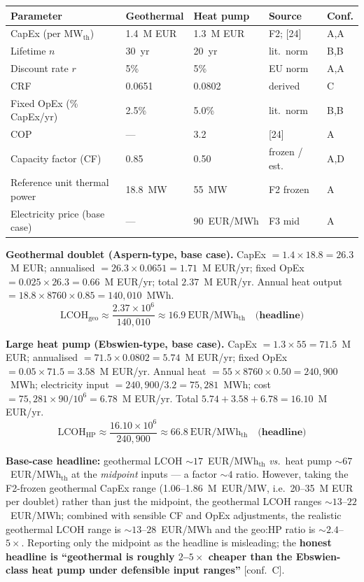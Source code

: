 \documentclass{article}
\begin{document}
\begin{center}
\begin{tabular}{lllll}
\hline
\textbf{Parameter} & \textbf{Geothermal} & \textbf{Heat pump} & \textbf{Source} & \textbf{Conf.} \\
\hline
CapEx (per MW$_{\mathrm{th}}$) & 1.4~M EUR & 1.3~M EUR & F2; [24] & A,A \\
Lifetime $n$                  & 30~yr     & 20~yr     & lit.\ norm & B,B \\
Discount rate $r$             & 5\%       & 5\%       & EU norm    & A,A \\
CRF                           & 0.0651    & 0.0802    & derived    & C \\
Fixed OpEx (\% CapEx/yr)      & 2.5\%     & 5.0\%     & lit.\ norm & B,B \\
COP                           & ---       & 3.2       & [24]       & A \\
Capacity factor (CF)          & 0.85      & 0.50      & frozen / est.& A,D \\
Reference unit thermal power  & 18.8~MW   & 55~MW     & F2 frozen  & A \\
Electricity price (base case) & ---       & 90~EUR/MWh & F3 mid     & A \\
\hline
\end{tabular}
\end{center}

\textbf{Geothermal doublet (Aspern-type, base case).} CapEx
$= 1.4 \times 18.8 = 26.3$~M EUR; annualised
$= 26.3 \times 0.0651 = 1.71$~M EUR/yr; fixed OpEx
$= 0.025 \times 26.3 = 0.66$~M EUR/yr; total
$2.37$~M EUR/yr. Annual heat output
$= 18.8 \times 8760 \times 0.85 = 140{,}010$~MWh.
\[
\mathrm{LCOH_{geo}} \approx \frac{2.37 \times 10^6}{140{,}010}
       \approx 16.9 \mathrm{~EUR/MWh_{th}}\quad\textbf{(headline)}
\]

\textbf{Large heat pump (Ebswien-type, base case).} CapEx
$= 1.3 \times 55 = 71.5$~M EUR; annualised
$= 71.5 \times 0.0802 = 5.74$~M EUR/yr; fixed OpEx
$= 0.05 \times 71.5 = 3.58$~M EUR/yr. Annual heat
$= 55 \times 8760 \times 0.50 = 240{,}900$~MWh; electricity input
$= 240{,}900 / 3.2 = 75{,}281$~MWh; cost
$= 75{,}281 \times 90 / 10^6 = 6.78$~M EUR/yr. Total
$5.74 + 3.58 + 6.78 = 16.10$~M EUR/yr.
\[
\mathrm{LCOH_{HP}} \approx \frac{16.10 \times 10^6}{240{,}900}
       \approx 66.8 \mathrm{~EUR/MWh_{th}}\quad\textbf{(headline)}
\]

\textbf{Base-case headline:} geothermal LCOH $\sim 17$~EUR/MWh$_{\mathrm{th}}$
\emph{vs.}\ heat pump $\sim 67$~EUR/MWh$_{\mathrm{th}}$ at the
\emph{midpoint} inputs --- a factor $\sim 4$ ratio. However, taking the
F2-frozen geothermal CapEx range (1.06--1.86~M~EUR/MW, i.e.\ 20--35~M EUR
per doublet) rather than just the midpoint, the geothermal LCOH ranges
$\sim 13$--$22$~EUR/MWh; combined with sensible CF and OpEx adjustments,
the realistic geothermal LCOH range is $\sim 13$--$28$~EUR/MWh and the
geo:HP ratio is $\sim 2.4$--$5\times$. Reporting only the
midpoint as the headline is misleading; the \textbf{honest headline is
``geothermal is roughly $2$--$5\times$ cheaper than the
Ebswien-class heat pump under defensible input ranges''} [conf.\ C].
\end{document}
